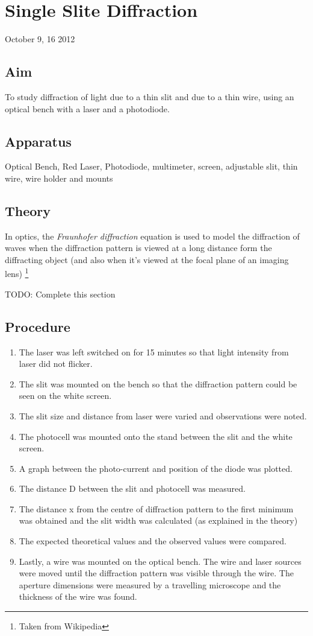 \chapter{Single Slite Diffraction}
\begin{flushright}
October 9, 16 2012
\end{flushright}
\section{Aim}
	To study diffraction of light due to a thin slit and due to a thin wire, using an optical bench with a laser and a photodiode. 
\section{Apparatus}	
	Optical Bench, Red Laser, Photodiode, multimeter, screen, adjustable slit, thin wire, wire holder and mounts

\section{Theory}
	In optics, the \emph{Fraunhofer diffraction} equation is used to model the diffraction of waves when the diffraction pattern is viewed at a long distance form the diffracting object (and also when it's viewed at the focal plane of an imaging lens) \footnote{Taken from Wikipedia}
	\par
	TODO: Complete this section	

\section{Procedure}
	\begin{enumerate}
		\item The laser was left switched on for 15 minutes so that light intensity from laser did not flicker.
		\item The slit was mounted on the bench so that the diffraction pattern could be seen on the white screen.
		\item The slit size and distance from laser were varied and observations were noted.
		\item The photocell was mounted onto the stand between the slit and the white screen.
		\item A graph between the photo-current and position of the diode was plotted.
		\item The distance D between the slit and photocell was measured.
		\item The distance x from the centre of diffraction pattern to the first minimum was obtained and the slit width was calculated (as explained in the theory)
		\item The expected theoretical values and the observed values were compared.
		\item Lastly, a wire was mounted on the optical bench. The wire and laser sources were moved until the diffraction pattern was visible through the wire. The aperture dimensions were measured by a travelling microscope and the thickness of the wire was found.  
	\end{enumerate}

